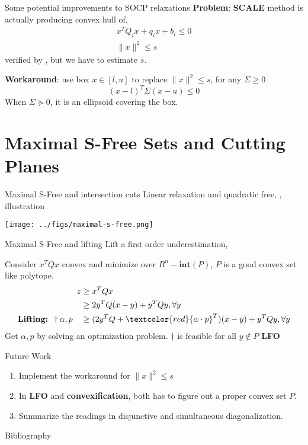 \documentclass[aspectratio=1610, 10pt]{beamer}
\newcommand{\intp}{\mathbf{int}}
\begin{document}
\begin{frame}[allowframebreaks]{Some potential improvements to SOCP relaxations}
  \textbf{Problem}: \textbf{SCALE} method is actually producing convex hull of,
  \begin{align*}
    x^TQ_i x + q_i x + b_i \le 0 \\
    \|x\|^2 \le s
  \end{align*}
  verified by \cite{burer_how_2017}, but we have to estimate \(s\).

  \textbf{Workaround}: use box \(x \in [l, u]\) to replace \(\|x\|^2 \le s\), for any \(\Sigma \ge 0\)
  \begin{equation}
    (x-l)^T\Sigma (x-u) \le 0
  \end{equation}
  When \(\Sigma \succeq 0\), it is an ellipsoid covering the box.
\end{frame}


\section{Maximal S-Free Sets and Cutting Planes}
\begin{frame}{Maximal S-Free and intersection cuts}
  Linear relaxation and quadratic free, \cite{chmiela_implementation_2021}, illustration

  \texttt{[image: ../figs/maximal-s-free.png]}

\end{frame}
\begin{frame}{Maximal S-Free and lifting}
  Lift a first order underestimation,

  Consider \(x^TQx\) convex and minimize over \(R^n - \intp(P)\), \(P\) is a good convex set like polytope.
  \begin{align*}
    z                                          & \ge x^TQx                                                               \\
                                               & \ge 2y^TQ(x-y) + y^TQy, \forall y                                       \\
    \textbf{Lifting: } \dagger \alpha, p \quad & \ge (2y^TQ + \textcolor{red}{\alpha \cdot p}^T)(x-y) + y^TQy, \forall y \\
  \end{align*}
  Get \(\alpha, p\) by solving an optimization problem. \(\dagger \) is feasible for all \(y \notin P\) \textbf{LFO}
\end{frame}

\begin{frame}{Future Work}
  \begin{enumerate}
    \item Implement the workaround for \(\|x\|^2 \le s\)
    \item In \textbf{LFO} and \textbf{convexification}, both has to figure out a proper convex set \(P\).
    \item Summarize the readings in disjunctive and simultaneous diagonalization.
  \end{enumerate}
\end{frame}
\begin{frame}[allowframebreaks]{Bibliography}
  
  
\end{frame}
\end{document}
